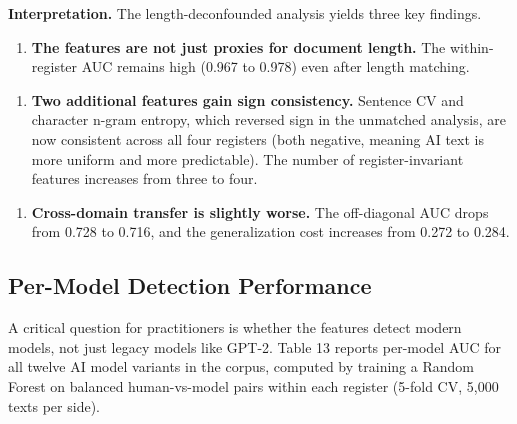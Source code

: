 \documentclass{article}
\begin{document}
\textbf{Interpretation.} The length-deconfounded analysis yields three key findings.

\begin{enumerate}
  \item \textbf{The features are not just proxies for document length.} The within-register AUC remains high (0.967 to 0.978) even after length matching.
\end{enumerate}

\begin{enumerate}
  \item \textbf{Two additional features gain sign consistency.} Sentence CV and character n-gram entropy, which reversed sign in the unmatched analysis, are now consistent across all four registers (both negative, meaning AI text is more uniform and more predictable). The number of register-invariant features increases from three to four.
\end{enumerate}

\begin{enumerate}
  \item \textbf{Cross-domain transfer is slightly worse.} The off-diagonal AUC drops from 0.728 to 0.716, and the generalization cost increases from 0.272 to 0.284.
\end{enumerate}

\subsection{Per-Model Detection Performance}

A critical question for practitioners is whether the features detect modern models, not just legacy models like GPT-2. Table 13 reports per-model AUC for all twelve AI model variants in the corpus, computed by training a Random Forest on balanced human-vs-model pairs within each register (5-fold CV, 5,000 texts per side).
\end{document}
